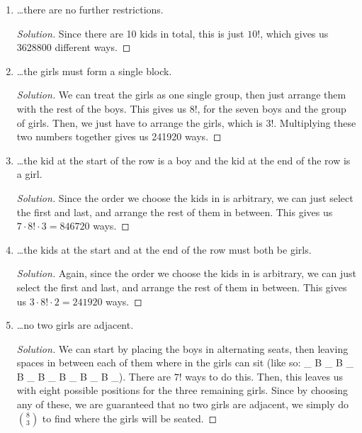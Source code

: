 \documentclass{article}
\newenvironment{solution}
  {\renewcommand\qedsymbol{$\blacksquare$}\begin{proof}[Solution]}
  {\end{proof}}
\begin{document}
\begin{enumerate}
\begin{solution}
    \end{solution}%
    \colorbox{CornflowerBlue}{
    \begin{minipage}[c]{0.9\textwidth}
        \centering
        For items \#11 to \#15, suppose three girls and seven boys are to be lined up in a row. Find the number of ways this can be done if\ldots{}
    \end{minipage}%
    }%
    \item \ldots there are no further restrictions.\begin{solution} 
        Since there are 10 kids in total, this is just $10! $, which gives us 3628800 different ways. 
    \end{solution} 
    \item \ldots the girls must form a single block.\begin{solution} 
        We can treat the girls as one single group, then just arrange them with the rest of the boys. This gives us $8! $, for the seven boys and the group of girls. 
        Then, we just have to arrange the girls, which is $3! $. Multiplying these two numbers together gives us 241920 ways. 
    \end{solution}
    \item \ldots the kid at the start of the row is a boy and the kid at the end of the row is a girl.\begin{solution} 
        Since the order we choose the kids in is arbitrary, we can just select the first and last, and arrange the rest of them in between. This gives us $7 \cdot 8! \cdot 3 = 846720$ ways. 
    \end{solution} 
    \item \ldots the kids at the start and at the end of the row must both be girls.\begin{solution} 
        Again, since the order we choose the kids in is arbitrary, we can just select the first and last, and arrange the rest of them in between. This gives us $ 3 \cdot 8! \cdot 2 = 241920$ ways. 
    \end{solution}
    \item \ldots no two girls are adjacent.\begin{solution} 
        We can start by placing the boys in alternating seats, then leaving spaces in between each of them where in the girls can sit (like so: \_ B \_ B \_ B \_ B \_ B \_ B \_ B \_). There are $7! $ ways to do this. Then, this leaves
        us with eight possible positions for the three remaining girls. Since by choosing any of these, we are guaranteed that no two girls are adjacent, we simply do $\binom{8}{3}$ to find where the girls will be seated.

\end{solution}
\end{enumerate}
\end{document}
